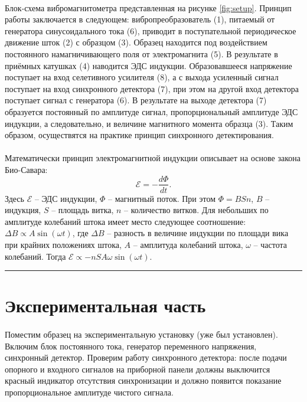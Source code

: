 \documentclass[a4paper,12pt]{article} %
\begin{document}
\paragraph{}
	Блок-схема вибромагнитометра представленная на рисунке \ref{fig:setup}. Принцип работы заключается в следующем: вибропреобразователь (1), питаемый от генератора синусоидального тока (6), приводит в поступательной периодическое движение шток (2) с образцом (3). Образец находится под воздействием постоянного намагничивающего поля от электромагнита (5). В результате в приёмных катушках (4) наводится ЭДС индукции. Образовавшееся напряжение поступает на вход селетивного усилителя (8), а с выхода усиленный сигнал поступает на вход синхронного детектора (7), при этом на другой вход детектора поступает сигнал с генератора (6). В результате на выходе детектора (7) образуется постоянный по амплитуде сигнал, пропорциональный амплитуде ЭДС индукции, а следовательно, и величине магнитного момента образца (3). Таким образом, осуществятся на практике принцип синхронного детектирования. 
	
\paragraph{}
	Математически принцип электромагнитной индукции описывает на основе закона Био-Савара: \[ \mathcal{E} = - \frac{d\Phi}{dt}. \] Здесь $\mathcal{E}$ -- ЭДС индукции, $\Phi$ -- магнитный поток. При этом $\Phi = BSn$, $B$ -- индукция, $S$ -- площадь витка, $n$ -- количество витков. Для небольших по амплитуде колебаний штока имеет место следующее соотношение: $\Delta B \propto A \sin(\omega t)$, где $\Delta B$ -- разность в величине индукции по площади вика при крайних положениях штока, $A$ -- амплитуда колебаний штока, $\omega$ -- частота колебаний. Тогда $\mathcal{E} \propto -nSA \omega \sin(\omega t)$.

	

\medskip\hrule\medskip

\section{Экспериментальная часть}

\paragraph{} Поместим образец на экспериментальную установку (уже был установлен). Включим блок постоянного тока, генератор переменного напряжения, синхронный детектор. Проверим работу синхронного детектора: после подачи опорного и входного сигналов на приборной панели должны выключится красный индикатор отсутствия синхронизации и должно появится показание пропорциональное амплитуде чистого сигнала.
\end{document}
